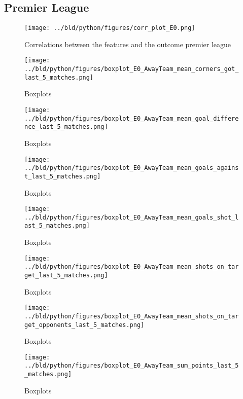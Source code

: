 \documentclass[11pt, a4paper, leqno]{article}
\begin{document}
\subsection{Premier League}
\begin{figure}[H]
    \centering
    \texttt{[image: ../bld/python/figures/corr\_plot\_E0.png]}
    \caption{Correlations between the features and the outcome premier league}
    \label{fig:figure2}
\end{figure}

\begin{figure}[H]
    \centering
    \texttt{[image: ../bld/python/figures/boxplot\_E0\_AwayTeam\_mean\_corners\_got\_last\_5\_matches.png]}
    \caption{Boxplots}
    \label{fig:figure2}
\end{figure}


\begin{figure}[H]
    \centering
    \texttt{[image: ../bld/python/figures/boxplot\_E0\_AwayTeam\_mean\_goal\_difference\_last\_5\_matches.png]}
    \caption{Boxplots}
    \label{fig:figure2}
\end{figure}

\begin{figure}[H]
    \centering
    \texttt{[image: ../bld/python/figures/boxplot\_E0\_AwayTeam\_mean\_goals\_against\_last\_5\_matches.png]}
    \caption{Boxplots}
    \label{fig:figure2}
\end{figure}

\begin{figure}[H]
    \centering
    \texttt{[image: ../bld/python/figures/boxplot\_E0\_AwayTeam\_mean\_goals\_shot\_last\_5\_matches.png]}
    \caption{Boxplots}
    \label{fig:figure2}
\end{figure}

\begin{figure}[H]
    \centering
    \texttt{[image: ../bld/python/figures/boxplot\_E0\_AwayTeam\_mean\_shots\_on\_target\_last\_5\_matches.png]}
    \caption{Boxplots}
    \label{fig:figure2}
\end{figure}

\begin{figure}[H]
    \centering
    \texttt{[image: ../bld/python/figures/boxplot\_E0\_AwayTeam\_mean\_shots\_on\_target\_opponents\_last\_5\_matches.png]}
    \caption{Boxplots}
    \label{fig:figure2}
\end{figure}

\begin{figure}[H]
    \centering
    \texttt{[image: ../bld/python/figures/boxplot\_E0\_AwayTeam\_sum\_points\_last\_5\_matches.png]}
    \caption{Boxplots}
    \label{fig:figure2}
\end{figure}
\end{document}
